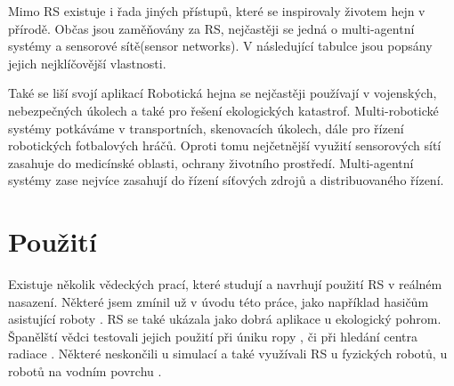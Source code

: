 \par 
Mimo RS existuje i řada jiných přístupů, které se inspirovaly životem hejn v přírodě. Občas jsou zaměňovány za RS, nejčastěji se jedná o multi-agentní systémy a sensorové sítě(sensor networks). V následující tabulce jsou popsány jejich nejklíčovější vlastnosti. \par
\begin{center}
    \begin{table} 
    \end{table}
    \end{center}
    Také se liší svojí aplikací Robotická hejna se nejčastěji používají v vojenských, nebezpečných úkolech a také pro řešení ekologických katastrof. Multi-robotické systémy potkáváme v transportních, skenovacích úkolech, dále pro řízení robotických fotbalových hráčů. Oproti tomu nejčetnější využití sensorových sítí zasahuje do medicínské oblasti, ochrany životního prostředí. Multi-agentní systémy zase nejvíce zasahují do řízení síťových zdrojů a distribuovaného řízení. 
\section{Použití}
Existuje několik vědeckých prací, které studují a navrhují použití RS v reálném nasazení. Některé jsem zmínil už v úvodu této práce, jako například hasičům asistující roboty \citep{fireRobots}. RS se také ukázala jako dobrá aplikace u ekologický pohrom. Španělští vědci testovali jejich použití při úniku ropy \citep{oilSwarm}, či při hledání centra radiace \citep{radiationSwarm}. Některé neskončili u simulací a také využívali RS u fyzických robotů, u robotů na vodním povrchu \citep{aquaticRobots}. \par

